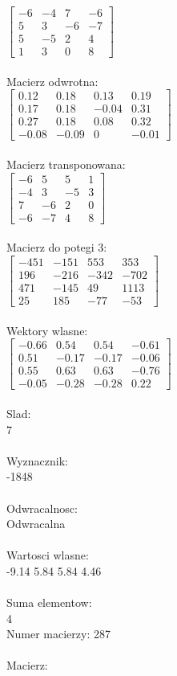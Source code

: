 \documentclass[a4paper,12pt]{article}
\begin{document}
$\begin{bmatrix} -6&-4&7&-6\\5&3&-6&-7\\5&-5&2&4\\1&3&0&8 \end{bmatrix}$
\\
\\
Macierz odwrotna:\\

$\begin{bmatrix} 0.12&0.18&0.13&0.19\\0.17&0.18&-0.04&0.31\\0.27&0.18&0.08&0.32\\-0.08&-0.09&0&-0.01 \end{bmatrix}$
\\
\\
Macierz transponowana:\\

$\begin{bmatrix} -6&5&5&1\\-4&3&-5&3\\7&-6&2&0\\-6&-7&4&8 \end{bmatrix}$
\\
\\
Macierz do potegi 3:\\

$\begin{bmatrix} -451&-151&553&353\\196&-216&-342&-702\\471&-145&49&1113\\25&185&-77&-53 \end{bmatrix}$
\\
\\
Wektory wlasne:\\

$\begin{bmatrix} -0.66&0.54&0.54&-0.61\\0.51&-0.17&-0.17&-0.06\\0.55&0.63&0.63&-0.76\\-0.05&-0.28&-0.28&0.22 \end{bmatrix}$
\\
\\
Slad:\\
7
\\
\\
Wyznacznik:\\
-1848
\\
\\
Odwracalnosc:\\
Odwracalna
\\
\\
Wartosci wlasne:\\
-9.14 5.84 5.84 4.46
\\
\\
Suma elementow:\\
4
\\
\newpage
Numer macierzy:
287
\\
\\
Macierz:\\
\end{document}
